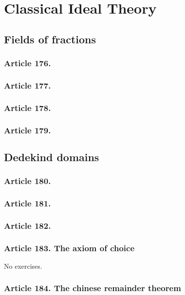\chapter{Classical Ideal Theory}

\section{Fields of fractions}


\subsection{Article 176.}

\subsection{Article 177.}

\subsection{Article 178.}

\subsection{Article 179.}


\section{Dedekind domains}


\subsection{Article 180.}

\subsection{Article 181.}

\subsection{Article 182.}

\subsection{Article 183. The axiom of choice}

No exercises.
\subsection{Article 184. The chinese remainder theorem}

